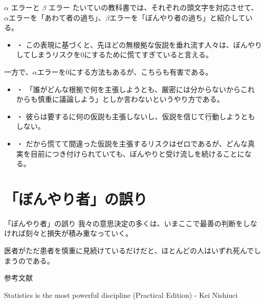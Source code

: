 \documentclass[dvipdfmx, autodetect-engine, aspectratio=169, 10.5pt]{beamer}
\begin{document}
\begin{frame}{$\alpha$ エラーと $\beta$ エラー}
	たいていの教科書では、それぞれの頭文字を対応させて、$\alpha$エラーを「あわて者の過ち」、$\beta$エラーを「ぼんやり者の過ち」と紹介している。
	\begin{itemize}
		\item ・ この表現に基づくと、先ほどの無根拠な仮説を垂れ流す人々は、ぼんやりしてしまうリスクを0にするために慌てすぎていると言える。
	\end{itemize}
	一方で、$\alpha$エラーを0にする方法もあるが、こちらも有害である。
	\begin{itemize}
		\item ・ 「誰がどんな根拠で何を主張しようとも、厳密には分からないからこれからも慎重に議論しよう」としか言わないというやり方である。
		\item ・ 彼らは要するに何の仮説も主張しないし、仮説を信じて行動しようともしない。
		\item ・ だから慌てて間違った仮説を主張するリスクはゼロであるが、どんな真実を目前につき付けられていても、ぼんやりと受け流しを続けることになる。
	\end{itemize}
\end{frame}

\section{「ぼんやり者」の誤り}

\begin{frame}{「ぼんやり者」の誤り}
	我々の意思決定の多くは、いまここで最善の判断をしなければ刻々と損失が積み重なっていく。

	医者がただ患者を慎重に見続けているだけだと、ほとんどの人はいずれ死んでしまうのである。
\end{frame}

\begin{frame}[allowframebreaks]{参考文献}
	\begin{thebibliography}{9}
		Statistics is the most powerful discipline (Practical Edition) - Kei Nishiuci
	\end{thebibliography}
\end{frame}
\end{document}
